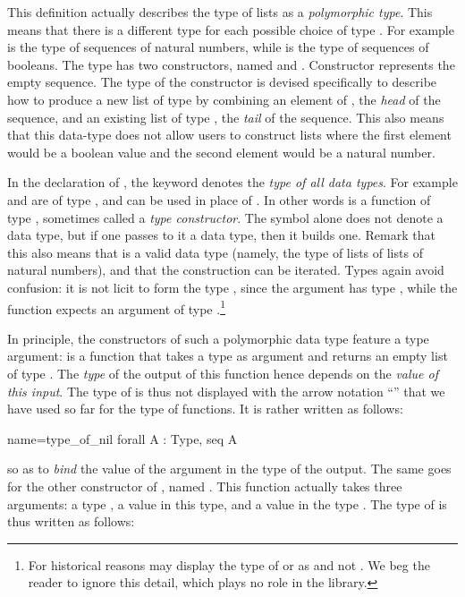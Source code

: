 This definition actually describes the type of lists as a {\em
  polymorphic type}.  This means that there is a different type
 for each possible choice of type .  For example
 is the type of sequences of natural numbers, while
 is the type of sequences of booleans.
The type  has two
constructors, named  and . Constructor 
represents the empty sequence. The type of the
constructor  is devised specifically to describe how to produce a
new list of type  by combining an element of , the
\emph{head} of the sequence, and an
existing list of type , the \emph{tail} of the sequence.  This
also means that this data-type
does not allow users to construct lists where the first element would be
a boolean value and the second element would be a natural number.

In the declaration of , the keyword  denotes the
\emph{type of all data types}.  For example  and  are of type
, and can be used in place of .
In other words  is a function of type , sometimes
called a \emph{type constructor}.  The symbol  alone does not
denote a data type,
but if one passes to it a data type, then it builds one.  Remark
that this also means that  is a valid data type
(namely, the type of lists of lists of natural numbers), and
that the construction can be iterated.
Types again avoid confusion: it is not licit to form the type ,
since the argument  has type , while the function
 expects an argument of type .\footnote{For historical
reasons \Coq{} may display the type of  or  as 
and not .  We beg the reader to ignore this detail, which
plays no role in the \mcbMC{} library.}

In principle, the constructors of such a polymorphic data type feature
a type argument:
 is a function that takes a type  as argument and returns
an empty list of type . The \emph{type} of the output of
this function hence depends on the \emph{value of this input}. The
type of  is thus not displayed with the arrow notation
``'' that we have used so far for the type of
functions. It is rather written as follows:

\begin{coq}{name=type_of_nil}{}
  forall A : Type, seq A
\end{coq}
so as to \emph{bind} the value  of the argument in the type of
the output. The same goes for the other constructor of , named
.  This function actually takes three arguments: a type ,
a value in this type, and a value in the type .  The type
of  is thus written as follows:

